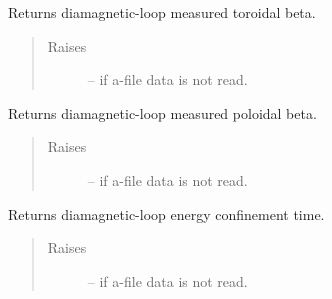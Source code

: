 \documentclass[letterpaper,10pt,english]{sphinxmanual}
\begin{document}
\begin{fulllineitems}
\begin{fulllineitems}
\begin{quote}
\begin{description}
\end{description}\end{quote}

\end{fulllineitems}


\begin{fulllineitems}
\label{eqtools:eqtools.eqdskreader.EqdskReader.getDiamagBetaT}
Returns diamagnetic-loop measured toroidal beta.
\begin{quote}\begin{description}
\item[{Raises }] \leavevmode
{} -- 
if a-file data is not read.

\end{description}\end{quote}

\end{fulllineitems}


\begin{fulllineitems}
\label{eqtools:eqtools.eqdskreader.EqdskReader.getDiamagBetaP}
Returns diamagnetic-loop measured poloidal beta.
\begin{quote}\begin{description}
\item[{Raises }] \leavevmode
{} -- 
if a-file data is not read.

\end{description}\end{quote}

\end{fulllineitems}


\begin{fulllineitems}
\label{eqtools:eqtools.eqdskreader.EqdskReader.getDiamagTauE}
Returns diamagnetic-loop energy confinement time.
\begin{quote}\begin{description}
\item[{Raises }] \leavevmode
{} -- 
if a-file data is not read.


\end{description}
\end{quote}
\end{fulllineitems}
\end{fulllineitems}
\end{document}
